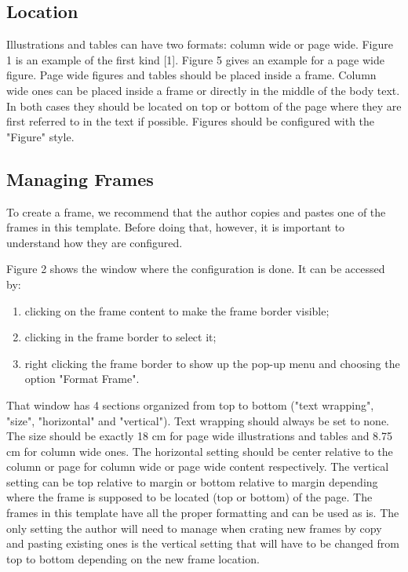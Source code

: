 \documentclass[10pt]{imeko_acta}
\begin{document}
\subsection{Location}

Illustrations and tables can have two formats: column wide or page wide. Figure 1 is an example of the first kind [1]. Figure 5 gives an example for a page wide figure.
Page wide figures and tables should be placed inside a frame. Column wide ones can be placed inside a frame or directly in the middle of the body text. In both cases they should be located on top or bottom of the page where they are first referred to in the text if possible. Figures should be configured with the "Figure" style.


\subsection{Managing Frames}

To create a frame, we recommend that the author copies and pastes one of the frames in this template. Before doing that, however, it is important to understand how they are configured. 

Figure 2 shows the window where the configuration is done. It can be accessed by: 
\begin{enumerate}
	\item clicking on the frame content to make the frame border visible;
	\item clicking in the frame border to select it;
	\item right clicking the frame border to show up the pop-up menu and choosing the option "Format Frame".
\end{enumerate}

That window has 4 sections organized from top to bottom ("text wrapping", "size", "horizontal" and "vertical"). 
Text wrapping should always be set to none. The size should be exactly 18 cm for page wide illustrations and tables and 8.75 cm for column wide ones. The horizontal setting should be center relative to the column or page for column wide or page wide content respectively. The vertical setting can be top relative to margin or bottom relative to margin depending where the frame is supposed to be located (top or bottom) of the page.
The frames in this template have all the proper formatting and can be used as is. The only setting the author will need to manage when crating new frames by copy and pasting existing ones is the vertical setting that will have to be changed from top to bottom depending on the new frame location.
\end{document}
